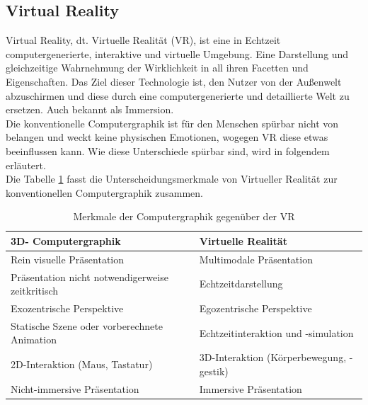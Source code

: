 \subsection*{Virtual Reality}
Virtual Reality, dt. Virtuelle Realität (\acs{VR}), ist eine in Echtzeit computergenerierte, interaktive und virtuelle Umgebung. Eine Darstellung 
und gleichzeitige Wahrnehmung der Wirklichkeit in all ihren Facetten und Eigenschaften. Das Ziel dieser Technologie ist, den Nutzer von der 
Außenwelt abzuschirmen und diese durch eine computergenerierte und detaillierte Welt zu ersetzen. \cite{vr.2018n} Auch bekannt als Immersion.
\\ 
\linebreak
Die konventionelle Computergraphik ist für den Menschen spürbar nicht von belangen und weckt keine physischen Emotionen, wogegen VR diese 
etwas beeinflussen kann. Wie diese Unterschiede spürbar sind, wird in folgendem erläutert.
\\  
Die Tabelle \ref{tbl:vrtabelle} fasst die Unterscheidungsmerkmale von Virtueller Realität zur konventionellen Computergraphik zusammen. \cite{springer.2019s}
\begin{table}[!htb]
    \centering
    \begin{tabular}{ll}
      \textbf{3D- Computergraphik}  & \textbf{Virtuelle Realität} \\
      \hline
      Rein visuelle Präsentation & Multimodale Präsentation \\ %
      \hline
      Präsentation nicht notwendigerweise zeitkritisch & Echtzeitdarstellung \\
      \hline
      Exozentrische Perspektive & Egozentrische Perspektive \\
      \hline
      Statische Szene oder vorberechnete Animation & Echtzeitinteraktion und -simulation \\ 
      \hline
      2D-Interaktion (Maus, Tastatur) & 3D-Interaktion (Körperbewegung, -gestik) \\ 
      \hline
      Nicht-immersive Präsentation & Immersive Präsentation \\ 
    \end{tabular}
    \caption{Merkmale der Computergraphik gegenüber der VR}
    \label{tbl:vrtabelle}
\end{table}
\\ 
\linebreak 
